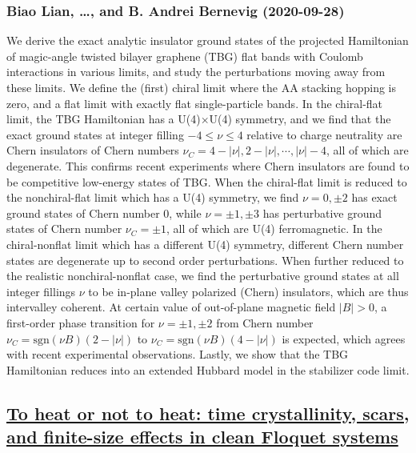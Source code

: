 \subsubsection*{Biao Lian, \dots, and B. Andrei Bernevig (2020-09-28)}
We derive the exact analytic insulator ground states of the projected
Hamiltonian of magic-angle twisted bilayer graphene (TBG) flat bands with
Coulomb interactions in various limits, and study the perturbations moving away
from these limits. We define the (first) chiral limit where the AA stacking
hopping is zero, and a flat limit with exactly flat single-particle bands. In
the chiral-flat limit, the TBG Hamiltonian has a U(4)$\times$U(4) symmetry, and
we find that the exact ground states at integer filling $-4\le \nu\le 4$
relative to charge neutrality are Chern insulators of Chern numbers
$\nu_C=4-|\nu|,2-|\nu|,\cdots,|\nu|-4$, all of which are degenerate. This
confirms recent experiments where Chern insulators are found to be competitive
low-energy states of TBG. When the chiral-flat limit is reduced to the
nonchiral-flat limit which has a U(4) symmetry, we find $\nu=0,\pm2$ has exact
ground states of Chern number $0$, while $\nu=\pm1,\pm3$ has perturbative
ground states of Chern number $\nu_C=\pm1$, all of which are U(4)
ferromagnetic. In the chiral-nonflat limit which has a different U(4) symmetry,
different Chern number states are degenerate up to second order perturbations.
When further reduced to the realistic nonchiral-nonflat case, we find the
perturbative ground states at all integer fillings $\nu$ to be in-plane valley
polarized (Chern) insulators, which are thus intervalley coherent. At certain
value of out-of-plane magnetic field $|B|>0$, a first-order phase transition
for $\nu=\pm1,\pm2$ from Chern number $\nu_C=\text{sgn}(\nu B)(2-|\nu|)$ to
$\nu_C=\text{sgn}(\nu B)(4-|\nu|)$ is expected, which agrees with recent
experimental observations. Lastly, we show that the TBG Hamiltonian reduces
into an extended Hubbard model in the stabilizer code limit.

\subsection*{\href{http://arxiv.org/abs/2009.13527v1}{To heat or not to heat: time crystallinity, scars, and finite-size  effects in clean Floquet systems}}
